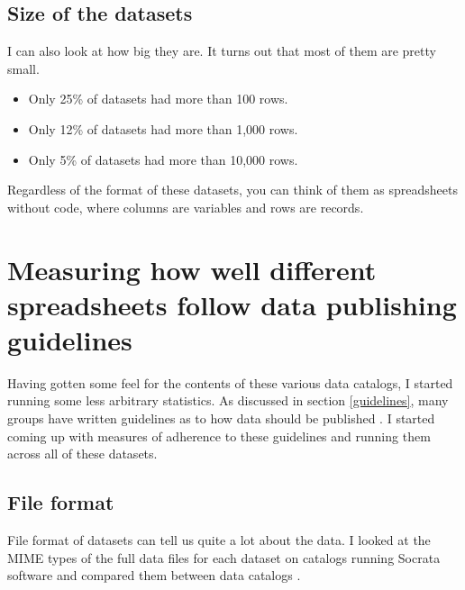 \documentclass{acm_proc_article-sp}
\begin{document}
\subsection{Size of the datasets}
I can also look at how big they are.
It turns out that most of them are pretty small.

\begin{itemize}
\setlength{\itemsep}{0pt}
\item Only 25\% of datasets had more than 100 rows.
\item Only 12\% of datasets had more than 1,000 rows.
\item Only 5\% of datasets had more than 10,000 rows.
\end{itemize}


Regardless of the format of these datasets, you can think of them as
spreadsheets without code, where columns are variables and rows are records.

\section{Measuring how well different spreadsheets follow data publishing guidelines}
Having gotten some feel for the contents of these various data catalogs,
I started running some less arbitrary statistics.
As discussed in section \ref{guidelines}, many groups have written guidelines
as to how data should be published
\cite{open-data-census,fivestars,sunlight,sebastopol,odi}.
I started coming up with measures of adherence to these guidelines and running
them across all of these datasets.

\subsection{File format}
File format of datasets can tell us quite a lot about the data. I looked at the
MIME types of the full data files for each dataset on catalogs running Socrata
software and compared them between data catalogs \cite{file-formats}.
\end{document}
